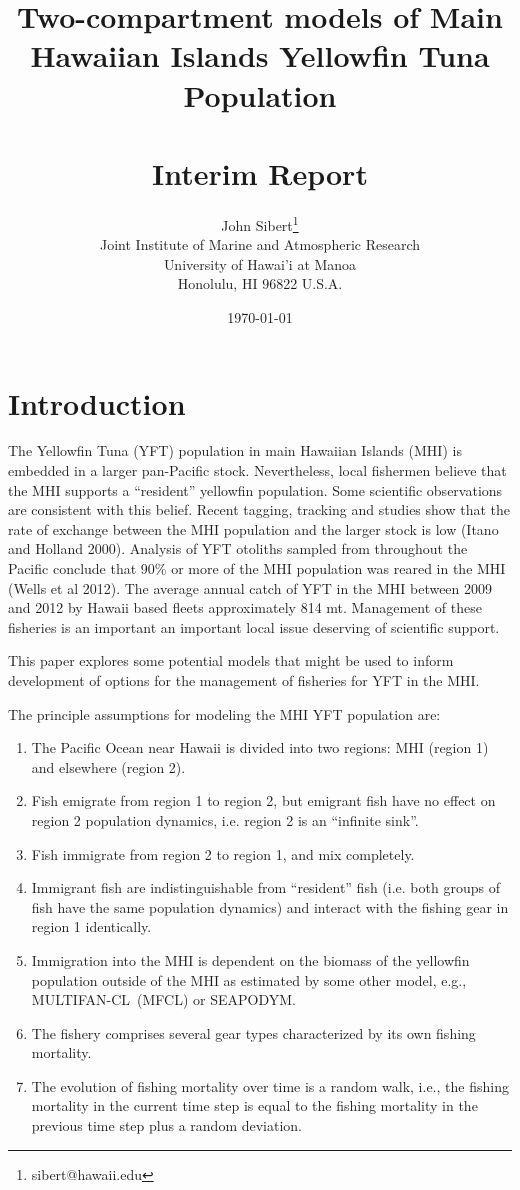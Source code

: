 \documentclass[12pt,letterpaper]{article}
\title{Two-compartment models of Main Hawaiian Islands Yellowfin Tuna
Population\\
~\\
Interim Report}
\author{
John Sibert\thanks{sibert@hawaii.edu}\\
Joint Institute of Marine and Atmospheric Research\\
University of Hawai'i at Manoa\\
Honolulu, HI  96822 U.S.A.\\[0.125in]
\date{\today}
}
\newcommand\doublespacing{\baselineskip=1.6\normalbaselineskip}
\newcommand\SD{SEAPODYM}
\newcommand\MFCL{MULTIFAN-CL}
\begin{document}
\maketitle

\doublespacing

\section*{Introduction}
The Yellowfin Tuna (YFT) population in main Hawaiian Islands (MHI) is
embedded in a larger pan-Pacific stock. Nevertheless, local fishermen
believe that the MHI supports a ``resident'' yellowfin population.
Some scientific observations are consistent with this belief. 
Recent tagging, tracking and
studies show that the rate of exchange between the MHI population
and the larger stock is low (Itano and Holland 2000). Analysis
of YFT otoliths sampled from
throughout the Pacific conclude that 90\% or more of the MHI
population was reared in the MHI (Wells et al 2012).
The average annual catch of YFT in the MHI between 2009 and 2012 by Hawaii
based fleets approximately 814 mt. Management of these
fisheries is an important an important local issue deserving of scientific support.

This paper explores some potential models that might be used to
inform development of options for the management of fisheries for YFT
in the MHI.

The principle assumptions for modeling the MHI YFT population are:
\begin{enumerate}
\item The Pacific Ocean near Hawaii is divided into two regions:
MHI (region 1) and elsewhere (region 2).%
\item Fish emigrate from region 1 to region 2, but emigrant fish have
no effect on region 2 population dynamics, i.e. region 2 is an ``infinite
sink''.
\item Fish immigrate from region 2 to region 1, and mix completely.
\item Immigrant fish are indistinguishable from ``resident'' fish
(i.e. both groups of fish have the same population dynamics) and
interact with the fishing gear in region 1 identically.
\item Immigration into the MHI is dependent on the
biomass of the yellowfin population outside of the MHI as estimated by
some other model, e.g., \MFCL\ (MFCL) or \SD.
\item The fishery comprises several gear types characterized by its
own fishing mortality.
\item The evolution of fishing mortality over time is a random walk,
i.e., the fishing mortality in the current time step is equal
to the fishing mortality in the previous time step plus a random
deviation.
\end{enumerate}
\end{document}
